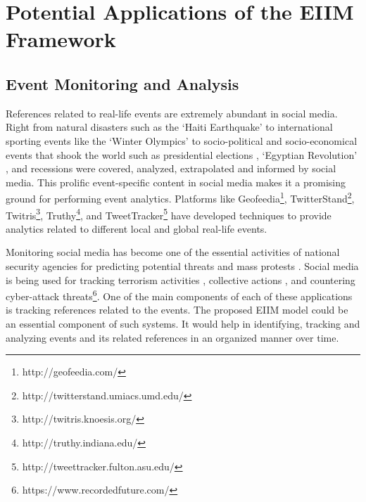 
\chapter{Potential Applications of the EIIM Framework} %

\label{applications} %


\section{Event Monitoring and Analysis}
References related to real-life events are extremely abundant in social media. Right from natural disasters such as the `Haiti Earthquake' \cite{gao2011harnessing} to international sporting events like the `Winter Olympics' \cite{walker2013russia} to socio-political \cite{singh2010mining} and socio-economical \cite{bollen2009modeling} events that shook the world such as presidential elections \cite{metzgar2009social}, `Egyptian Revolution' \cite{choudhary2012social}, and recessions were covered, analyzed, extrapolated and informed by social media. This prolific event-specific content in social media makes it a promising ground for performing event analytics. Platforms like Geofeedia\footnote{http://geofeedia.com/}, TwitterStand\footnote{http://twitterstand.umiacs.umd.edu/}, Twitris\footnote{http://twitris.knoesis.org/}, Truthy\footnote{http://truthy.indiana.edu/}, and TweetTracker\footnote{http://tweettracker.fulton.asu.edu/}  have developed techniques to provide analytics related to different local and global real-life events. 

Monitoring social media has become one of the essential activities of national security agencies for predicting potential threats and mass protests \cite{ghannam2011social}. Social media is being used for tracking terrorism activities \cite{oh2011information}, collective actions \cite{agarwal2014online}, and countering cyber-attack threats\footnote{https://www.recordedfuture.com/}. One of the main components of each of these applications is tracking references related to the events. The proposed EIIM model could be an essential component of such systems. It would help in identifying, tracking and analyzing events and its related references in an organized manner over time.



